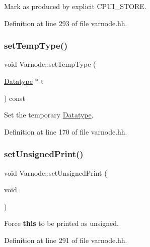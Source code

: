 Mark as produced by explicit C\+P\+U\+I\+\_\+\+S\+T\+O\+RE. 



Definition at line 293 of file varnode.\+hh.

\mbox{\label{class_varnode_a943c99fe7f3c62792570e35c0c205422}} 
\subsubsection{\texorpdfstring{setTempType()}{setTempType()}}
{\footnotesize\ttfamily void Varnode\+::set\+Temp\+Type (\begin{DoxyParamCaption}\item[{\mbox{\hyperlink{class_datatype}{Datatype}} $\ast$}]{t }\end{DoxyParamCaption}) const\hspace{0.3cm}{\ttfamily [inline]}}



Set the temporary \mbox{\hyperlink{class_datatype}{Datatype}}. 



Definition at line 170 of file varnode.\+hh.

\mbox{\label{class_varnode_a356ee1ae819a8bd9ffb225b640d2979f}} 
\subsubsection{\texorpdfstring{setUnsignedPrint()}{setUnsignedPrint()}}
{\footnotesize\ttfamily void Varnode\+::set\+Unsigned\+Print (\begin{DoxyParamCaption}\item[{void}]{ }\end{DoxyParamCaption})\hspace{0.3cm}{\ttfamily [inline]}}



Force {\bfseries{this}} to be printed as unsigned. 



Definition at line 291 of file varnode.\+hh.

\mbox{\label{class_varnode_ae5fb93c31c77ab156b9a9a88045e83db}} 
